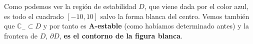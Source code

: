\documentclass[a4paper,11pt,spanish,leqno]{article}
\begin{document}
Como podemos ver la región de estabilidad $D$, que viene dada por el color azul, es todo el
cuadrado $[-10,10]$ salvo la forma blanca del centro. Vemos también que $ \mathbb{C}_-
\subset D$ y por tanto es \textbf{A-estable} (como habíamos determinado antes) y la frontera de $D$, $\partial D$, \textbf{es el contorno de la figura blanca}.
\end{document}
